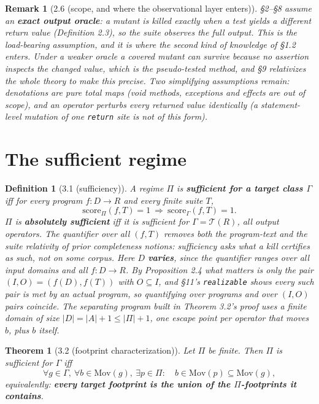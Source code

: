 \documentclass[conference]{IEEEtran}
\newcommand{\Mov}{\mathrm{Mov}}
\newcommand{\score}{\mathrm{score}}
\theoremstyle{run}
\newtheorem*{definition}{Definition}
\newtheorem*{theorem}{Theorem}
\newtheorem*{remark}{Remark}
\begin{document}
\begin{remark}[2.6 (scope, and where the observational layer enters)]
\S 2--\S 8 assume an \textbf{exact output oracle}: a mutant is killed exactly when a test yields a different return value (Definition 2.3), so the suite observes the full output. This is the load-bearing assumption, and it is where the second kind of knowledge of \S 1.2 enters. Under a weaker oracle a \emph{covered} mutant can survive because no assertion inspects the changed value, which is the pseudo-tested method, and \S 9 relativizes the whole theory to make this precise. Two simplifying assumptions remain: denotations are pure total maps (void methods, exceptions and effects are out of scope), and an operator perturbs every returned value identically (a statement-level mutation of one \texttt{return} site is not of this form).
\end{remark}

\setcounter{section}{2}
\section{The sufficient regime}
\begin{definition}[3.1 (sufficiency)]
A regime $\Pi$ is \textbf{sufficient for a target class $\Gamma$} iff for \emph{every} program $f : D \to R$ and \emph{every} finite suite $T$, \[ \score_\Pi(f,T) = 1 \ \Longrightarrow\ \score_\Gamma(f,T) = 1. \] $\Pi$ is \textbf{absolutely sufficient} iff it is sufficient for $\Gamma = \mathcal{T}(R)$, all output operators. The quantifier over all $(f,T)$ removes both the program-text and the suite relativity of prior completeness notions: sufficiency asks what a kill certifies \emph{as such}, not on some corpus. Here $D$ \textbf{varies}, since the quantifier ranges over all input domains and all $f : D \to R$. By Proposition 2.4 what matters is only the pair $(I, O) = (f(D), f(T))$ with $O \subseteq I$, and \S 11's \texttt{realizable} shows every such pair is met by an actual program, so quantifying over programs and over $(I,O)$ pairs coincide. The separating program built in Theorem 3.2's proof uses a finite domain of size $|D| = |A| + 1 \le |\Pi| + 1$, one escape point per operator that moves $b$, plus $b$ itself.
\end{definition}

\begin{theorem}[3.2 (footprint characterization)]
Let $\Pi$ be finite. Then $\Pi$ is sufficient for $\Gamma$ iff \[ \forall g \in \Gamma,\ \forall b \in \Mov(g),\ \exists p \in \Pi:\quad b \in \Mov(p) \subseteq \Mov(g), \] equivalently: \textbf{every target footprint is the union of the $\Pi$-footprints it contains}.
\end{theorem}
\end{document}
